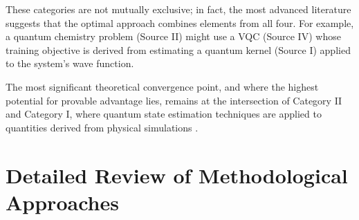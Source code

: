 \documentclass{article}
\begin{document}
These categories are not mutually exclusive; in fact, the most advanced literature suggests that the optimal approach combines elements from all four. For example, a quantum chemistry problem (Source II) might use a VQC (Source IV) whose training objective is derived from estimating a quantum kernel (Source I) applied to the system's wave function.

\begin{table}[ht]
\centering
\caption{Comparison of Category across Source of Hardness, Primary ML Task, Key Concept, Illustrative Papers}
\label{tab:1}
\end{table}

The most significant theoretical convergence point, and where the highest potential for provable advantage lies, remains at the intersection of Category II and Category I, where quantum state estimation techniques are applied to quantities derived from physical simulations \cite{daley2022practical}.

\section{Detailed Review of Methodological Approaches}

\label{sec:detailed\_review\_of\_methodological\_approa}
\end{document}
